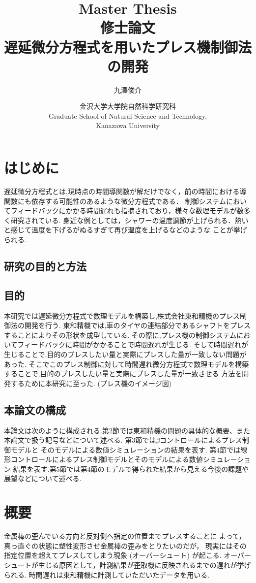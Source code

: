 \documentclass [dvipdfmx] {jsarticle}
\title{Master Thesis \\ \bigskip 
修士論文 \\ \bigskip 
{\bf  遅延微分方程式を用いたプレス機制御法の開発 }\\ \bigskip 
}
\author{九澤俊介}
\date{金沢大学大学院自然科学研究科 \\
Graduate School of Natural Science and Technology, \\
Kanazawa University}
\numberwithin{equation}{section}
\theoremstyle{definition} %
\theoremstyle{definition} %
\begin{document}
\maketitle
\thispagestyle{empty}
\setcounter{page}{-1}


\thispagestyle{empty}

\mbox{}\newpage 

\tableofcontents
\clearpage
\section{はじめに}

遅延微分方程式とは,現時点の時間導関数が解だけでなく，前の時間における導関数にも依存する可能性のあるような微分方程式である．
制御システムにおいてフィードバックにかかる時間遅れも指摘されており，様々な数理モデルが数多く研究されている.
身近な例としては，シャワーの温度調節が上げられる．熱いと感じて温度を下げるがぬるすぎて再び温度を上げるなどのような
ことが挙げられる.

\subsection{研究の目的と方法} 
\subsection{目的}
本研究では遅延微分方程式で数理モデルを構築し,株式会社東和精機のプレス制御法の開発を行う.
東和精機では,車のタイヤの連結部分であるシャフトをプレスすることによりその形状を成型している.
その際に,プレス機の制御システムにおいてフィードバックに時間がかかることで時間遅れが生じる.
そして時間遅れが生じることで,目的のプレスしたい量と実際にプレスした量が一致しない問題があった.
そこでこのプレス制御に対して時間遅れ微分方程式で数理モデルを構築することで,目的のプレスしたい量と実際にプレスした量が一致させる
方法を開発するために本研究に至った.
(プレス機のイメージ図)
\subsection{本論文の構成}
本論文は次のように構成される.第2節では東和精機の問題の具体的な概要、また本論文で扱う記号などについて述べる.
第3節では$\beta$コントロールによるプレス制御モデルと
そのモデルによる数値シミュレーションの結果を表す.
第4節では線形コントロールによるプレス制御モデルとそのモデルによる数値シミュレーション
結果を表す.第5節では第4節のモデルで得られた結果から見える今後の課題や展望などについて述べる.
\section{概要}
金属棒の歪んでいる方向と反対側へ指定の位置までプレスすることに
よって，真っ直ぐの状態に塑性変形させ金属棒の歪みをとりたいのだが，
現実にはその指定位置を超えてプレスしてしまう現象 (オーバーシュート) が起こる.
オーバーシュートが生じる原因として，計測結果が歪取機に反映されるまでの遅れが挙げられる.
時間遅れは東和精機に計測していただいたデータを用いる.
\end{document}
